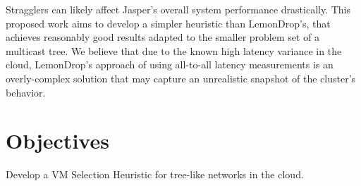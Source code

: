 \documentclass{article}
\begin{document}
Stragglers can likely affect Jasper's overall system performance drastically.
This proposed work aims to develop a simpler heuristic than LemonDrop's, that achieves reasonably good results 
adapted to the smaller problem set of a multicast tree. 
We believe that due to the known high latency variance in the cloud, LemonDrop's approach of using all-to-all latency measurements
is an overly-complex solution that may capture an unrealistic snapshot of the cluster's behavior.


\section{Objectives}
Develop a VM Selection Heuristic for tree-like networks in the cloud.
\end{document}
